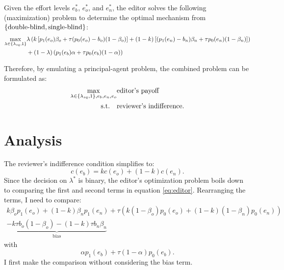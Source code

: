 \documentclass[12pt]{article}
\begin{document}
Given the effort levels $e_b^*$, $e_o^*$, and $e_n^*$, the editor solves the
following (maximization) problem to determine the optimal mechanism from
$\left\{\text{double-blind}, \text{single-blind}\right\}$:
\begin{equation}
    \begin{split}\label{eq:editor}
        \max_{\lambda \in \left\{\lambda_{sq},1\right\}} & \lambda\left(k \left[p_1(e_o)\beta_o+\tau (p_0(e_o)-b_o)(1-\beta_o)\right]+(1-k)\left[(p_1(e_n)-b_n)\beta_n+\tau p_0(e_n)(1-\beta_n)\right] \right) \\
                                                & +(1-\lambda)\left(p_1(e_b)\alpha+\tau p_0(e_b)(1-\alpha)\right)                                                                       \\
    \end{split}
\end{equation}

Therefore, by emulating a principal-agent problem, the combined problem can be
formulated as:
\begin{equation}\label{eq:combined}
    \begin{split}
        \max_{\lambda \in \left\{\lambda_{sq}, 1\right\}, e_b, e_n, e_o} & \text{editor's payoff}          \\
        \text{s.t.} \quad                                       & \text{reviewer's indifference}.
    \end{split}
\end{equation}

\section{Analysis} \label{sec:analysis}
The reviewer's indifference condition simplifies to:
\begin{equation*}
    c(e_b) = k c(e_o) + (1 - k) c(e_n).
\end{equation*}
Since the decision on $\lambda^*$ is binary, the editor's optimization problem
boils down to comparing the first and second terms in equation \ref{eq:editor}.
Rearranging the terms, I need to compare:
\begin{equation*}
    \begin{split}
        k\beta_o p_1(e_o) + (1-k)\beta_n p_1(e_n) + \tau(k(1-\beta_o)p_0(e_o) + (1-k)(1-\beta_n)p_0(e_n)) \\
        \underbrace{-k\tau b_o(1-\beta_o) - (1-k)\tau b_n\beta_n }_{\text{bias}}
    \end{split}
\end{equation*} with \[\alpha p_1(e_b) + \tau(1-\alpha)p_0(e_b).\]
I first make the comparison without considering the bias term.
\end{document}

